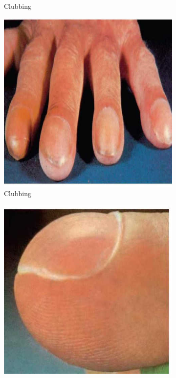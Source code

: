 \documentclass[a4paper,12pt,openany,oneside]{book}
\begin{document}
{\begin{figure}[h]
\begin{subfigure}[t]{.23\textwidth}
																	\caption{Clubbing}
																	\label{Clubbing1}
																\end{subfigure}
																\hspace{\fill}
																\begin{subfigure}[t]{.23\textwidth}
																	\centering
																	\includegraphics[width=\textwidth]{./clinicalPhysioPic/clubbing3-1.jpg}
																	\caption{Clubbing}
																	\label{Clubbing2}
																\end{subfigure}
																\hspace{\fill}
																\begin{subfigure}[t]{.23\textwidth}
																	\centering
																	\includegraphics[width=\textwidth]{./clinicalPhysioPic/clubbing3-2.jpg}

\end{subfigure}
\end{figure}}
\end{document}
